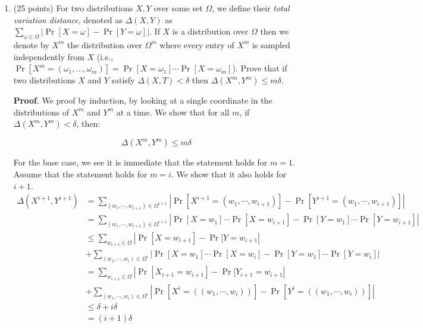 \documentclass{article}
\begin{document}
\begin{enumerate}
\item{}
(25 points) For two distributions $X,Y$ over some set $\Omega$, we define their \emph{total variation distance}, denoted as $\Delta(X,Y)$ as $\sum_{\omega\in\Omega}\left| \Pr[X=\omega]-\Pr[Y=\omega]\right|$. If $X$ is a distribution over $\Omega$ then we denote by $X^m$ the distribution over $\Omega^m$ where every entry of $X^m$ is sampled independently from $X$ (i.e., $\Pr[ X^m = (\omega_1,\ldots,\omega_m)]=\Pr[X=\omega_1]\cdots\Pr[X=\omega_m]$). Prove that if two distributions  $X$ and $Y$ satisfy $\Delta(X,T)<\delta$ then  $\Delta(X^m,Y^m) \leq m\delta$.%

\begin{mdbmarginx}{1ex}{0pt}{1ex}{0pt}%
\noindent{}\textbf{Proof}.  We proof by induction, by looking at a single coordinate in the distributions of $X^m$ and $Y^m$ at
a time. We show that for all $m$, if $\Delta(X^m,Y^m) < \delta$, then:%
\end{mdbmarginx}%
\noindent\noindent\[%
\Delta(X^m,Y^m) \leq m\delta
\]%

For the base case, we see it is immediate that the statement holds for $m=1$. Assume that the statement
holds for $m = i$. We show that it also holds for $i + 1$.%
\noindent\noindent\[%
\begin{aligned}
\Delta(X^{i+1},Y^{i+1}) &= \sum_{(w_1,\cdots,w_{i+1}) \in \Omega^{i+1}} |\Pr[X^{i+1} = (w_1,\cdots,w_{i+1})] - \Pr[Y^{i+1} = (w_1,\cdots,w_{i+1})]| \\
&=  \sum_{(w_1,\cdots,w_{i+1}) \in \Omega^{i+1}} |\Pr[X = w_1]\cdots \Pr[X = w_{i+1}] - \Pr[Y =w_1]\cdots \Pr[Y = w_{i+1}]| \\
&\leq  \sum_{w_{i+1} \in \Omega} |\Pr[X = w_{i+1}] - \Pr[Y = w_{i+1}|  \\
&+\sum_{(w_1,\cdots,w_{i}) \in \Omega^{i}} |\Pr[X = w_1]\cdots \Pr[X = w_{i}] - \Pr[Y =w_1]\cdots \Pr[Y = w_{i}]| \\
&= \sum_{w_{i+1} \in \Omega} |\Pr[X_{i+1} = w_{i+1}] - \Pr[Y_{i+1} = w_{i+1}| \\
&+ \sum_{(w_1,\cdots,w_{i}) \in \Omega^{i}} |\Pr[X^{i} = ((w_1,\cdots,w_{i}))] - \Pr[Y^{i} = ((w_1,\cdots,w_{i}))]|\\
&\leq \delta + i\delta \\
&= (i+1)\delta
\end{aligned}
\]%


\end{enumerate}
\end{document}
